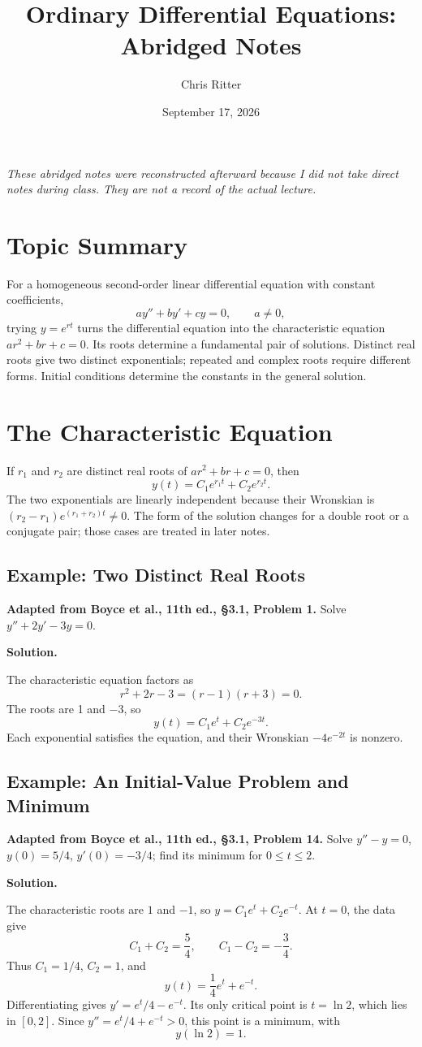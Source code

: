 \documentclass[11pt]{article}
\title{Ordinary Differential Equations: Abridged Notes}
\author{Chris Ritter}
\date{September 17, 2026}
\newenvironment{solution}
    {\par\noindent\textbf{Solution.}\par}
    {\par}
\begin{document}
\maketitle
\begin{center}
\small\emph{These abridged notes were reconstructed afterward because I did not take
direct notes during class. They are not a record of the actual lecture.}
\end{center}
\tableofcontents
\newpage

\section{Topic Summary}
For a homogeneous second-order linear differential equation with
constant coefficients,
\[
ay''+by'+cy=0,\qquad a\ne0,
\]
trying \(y=e^{rt}\) turns the differential equation into the
characteristic equation \(ar^2+br+c=0\). Its roots determine a
fundamental pair of solutions. Distinct real roots give two distinct
exponentials; repeated and complex roots require different forms.
Initial conditions determine the constants in the general solution.

\section{The Characteristic Equation}
If \(r_1\) and \(r_2\) are distinct real roots of
\(ar^2+br+c=0\), then
\[
\boxed{y(t)=C_1e^{r_1t}+C_2e^{r_2t}.}
\]
The two exponentials are linearly independent because their
Wronskian is \((r_2-r_1)e^{(r_1+r_2)t}\ne0\). The form of the
solution changes for a double root or a conjugate pair; those cases
are treated in later notes.

\subsection{Example: Two Distinct Real Roots}
\textbf{Adapted from Boyce et al., 11th ed., \S3.1, Problem 1.}
Solve \(y''+2y'-3y=0\).
\begin{solution}
The characteristic equation factors as
\[
r^2+2r-3=(r-1)(r+3)=0.
\]
The roots are 1 and \(-3\), so
\[
\boxed{y(t)=C_1e^t+C_2e^{-3t}.}
\]
Each exponential satisfies the equation, and their Wronskian
\(-4e^{-2t}\) is nonzero.
\end{solution}

\subsection{Example: An Initial-Value Problem and Minimum}
\textbf{Adapted from Boyce et al., 11th ed., \S3.1, Problem 14.}
Solve \(y''-y=0\), \(y(0)=5/4\), \(y'(0)=-3/4\); find its minimum
for \(0\leq t\leq2\).
\begin{solution}
The characteristic roots are \(1\) and \(-1\), so
\(y=C_1e^t+C_2e^{-t}\). At \(t=0\), the data give
\[
C_1+C_2=\frac54,\qquad C_1-C_2=-\frac34.
\]
Thus \(C_1=1/4\), \(C_2=1\), and
\[
y(t)=\frac14e^t+e^{-t}.
\]
Differentiating gives \(y'=e^t/4-e^{-t}\). Its only critical point
is \(t=\ln2\), which lies in \([0,2]\). Since
\(y''=e^t/4+e^{-t}>0\), this point is a minimum, with
\[
\boxed{y(\ln2)=1.}
\]
\end{solution}
\end{document}
